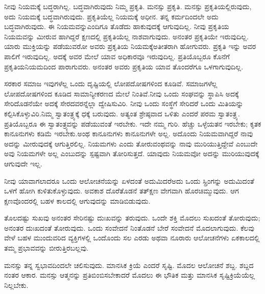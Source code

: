 ನೀವು ನಿಯಮಕ್ಕೆ ಬದ್ಧರಾಗಿಲ್ಲ. ಬದ್ಧವಾಗಿರುವುದು ನಿಮ್ಮ ಪ್ರಕೃತಿ. ಮನಸ್ಸು ಪ್ರಕೃತಿ. ಮನಸ್ಸು ಪ್ರಕೃತಿಯಲ್ಲಿರುವುದು, ಅದು ನಿಯಮಕ್ಕೆ ಬದ್ಧವಾಗಿರುವುದು. ಪ್ರಕೃತಿಯೆಲ್ಲ ನಿಯಮಕ್ಕೆ ಅಧೀನ. ತನ್ನ ಕರ್ಮದಿಂದಲೇ ಅದು ಬದ್ಧವಾಗಿರುವುದು. ಈ ನಿಯಮವನ್ನು\break ಎಂದಿಗೂ ತೊಡೆದು ಹಾಕುವುದಕ್ಕೆ ಆಗುವುದಿಲ್ಲ. ನೀವು ಪ್ರಕೃತಿಯ ನಿಯಮವನ್ನು ಮೀರುವ ಹಾಗಿದ್ದರೆ ಕ್ಷಣದಲ್ಲಿ ಪ್ರಕೃತಿಯೆಲ್ಲ ನಾಶವಾಗುವುದು. ಅನಂತರ ಪ್ರಕೃತಿಯೇ ಇರುವುದಿಲ್ಲ. ಯಾರು ಮುಕ್ತಿಯನ್ನು ಪಡೆಯುವರೋ ಅವರು ಪ್ರಕೃತಿಯ ನಿಯಮಕ್ಕೆ\break ಅತೀತರಾಗಿ ಹೋಗುವರು. ಪ್ರಕೃತಿ ಇನ್ನು ಅವರ ಪಾಲಿಗೆ ಇರುವುದಿಲ್ಲ. ಅದಕ್ಕೆ ಅವರ ಮೇಲೆ ಯಾವ ಅಧಿಕಾರವೂ ಇರುವುದಿಲ್ಲ. ಪ್ರತಿಯೊಬ್ಬರೂ ಕೊನೆಗೆ ಪ್ರಕೃತಿಯ\break ನಿಯಮದಿಂದ ಪಾರಾಗುವರು. ಅನಂತರ ಅವರು ಪ್ರಕೃತಿಯ ಯಾವ ತೊಂದರೆಗೂ ಒಳಗಾಗುವುದಿಲ್ಲ.

ಸರಕಾರ ಸಮಾಜ ಇವುಗಳೆಲ್ಲ ಒಂದು ದೃಷ್ಟಿಯಲ್ಲಿ ಲೋಪದೋಷಗಳಿಂದ ಕೂಡಿವೆ. ಸಮಾಜಗಳೆಲ್ಲ ಲೋಪದೋಷಗಳಿಂದ ಕೂಡಿದ ಸಾಮಾನ್ಯೀಕರಣದ ಮೇಲೆ ನಿಂತಿವೆ.\break ನೀವು ಒಂದು ಸಂಘವನ್ನು ಸ್ಥಾಪಿಸಿ ಅದಕ್ಕೆ ಸೇರಿದೊಡನೆಯೇ ಅದಕ್ಕೆ ಸೇರದವರನ್ನೆಲ್ಲಾ ದ್ವೇಷಿಸುವಿರಿ. ನೀವು ಒಂದು ಸಂಸ್ಥೆಗೆ ಸೇರಿದರೆ ಒಂದು ಮಿತಿಯನ್ನು ಕಲ್ಪಿಸಿಕೊಳ್ಳುವಿರಿ.\break ನಿಮ್ಮ ಸ್ವಾತಂತ್ರ್ಯಕ್ಕೆ ಧಕ್ಕೆ ಬರುವುದು. ಅತ್ಯಂತ ಶ್ರೇಷ್ಠವಾದ ಒಳಿತು ಎಂದರೆ ಪರಮ ಸ್ವಾತಂತ್ರ್ಯ. ಪ್ರತಿಯೊಬ್ಬರೂ ಈ ಸ್ವಾತಂತ್ರ್ಯವನ್ನು ಪಡೆಯುವಂತೆ ಇರಬೇಕು. ಇದೇ ನಮ್ಮ ಗುರಿ. ಹೆಚ್ಚು ಒಳ್ಳೆಯತನ ಇರಬೇಕು; ಕೃತಕ ಕಾನೂನುಗಳು ಕಡಿಮೆ ಇರಬೇಕು.\break ಅಂಥ ಕಾನೂನುಗಳು ಕಾನೂನುಗಳೇ ಅಲ್ಲ. ಅದೊಂದು ನಿಯಮವಾಗಿದ್ದರೆ ನಾವು ಅದನ್ನು ಮೀರುವುದಕ್ಕೆ ಆಗುತ್ತಿರಲಿಲ್ಲ. ನಿಯಮಗಳು ಎಂದು ತೋರುವಂಥವನ್ನು ನಾವು ಮುರಿಯುತ್ತಿದ್ದೇವೆ ಎಂಬುದೇ ಅವು ನಿಯಮಗಳೇ ಅಲ್ಲ ಎಂಬುದನ್ನು ಸ್ಪಷ್ಟವಾಗಿ ತೋರಿಸುತ್ತದೆ. ಯಾವುದು ನಿಯಮವೋ ಅದನ್ನು ಮುರಿಯುವುದಕ್ಕೆ ಆಗುವುದೇ ಇಲ್ಲ.

\vskip 6pt

ನೀವು ಯಾವಾಗಲಾದರೂ ಒಂದು ಆಲೋಚನೆಯನ್ನು ಏಳದಂತೆ ಅದುಮಿದರೆ\break ಅದು ಒಂದು ಸ್ಪ್ರಿಂಗನ್ನು ಅದುಮಿದಂತೆ ಒಳಗೆ ಹೋಗಿ ಕುಳಿತುಕೊಳ್ಳುವುದು. ಅವಕಾಶ ದೊರೆತೊಡನೆ ತತ್​ಕ್ಷಣ ವೇಗವಾಗಿ ಹೊರಚಿಮ್ಮುವುದು. ಆಗ ಕ್ಷಣವೊಂದರಲ್ಲಿ ಬಹಳ ಕಾಲದಲ್ಲಿ ಆಗುವುದನ್ನು ಮಾಡಿಬಿಡುವುದು.

\vskip 6pt

ತೊಲದಷ್ಟು ಸುಖವು ಅನಂತರ ಸೇರಿನಷ್ಟು ದುಃಖವನ್ನು ತರುವುದು. ಒಂದೇ ಶಕ್ತಿ ಮೊದಲು ಸುಖದಂತೆ ತೋರುವುದು; ಅನಂತರ ದುಃಖದಂತೆ ತೋರುವುದು. ಒಂದು ಸಂವೇದನೆ ನಿಂತೊಡನೆ ಬೇರೆ ಸಂವೇದನೆ ಮೊದಲಾಗುವುದು. ಕೆಲವು ವೇಳೆ ಬಹಳ ಮುಂದುವರಿದ ವ್ಯಕ್ತಿಗಳಲ್ಲಿ ಒಂದೊಂದು ಸಲ ಎರಡು ಅಥವಾ ನೂರಾರು ಆಲೋಚನೆಗಳು ಏಕಕಾಲದಲ್ಲಿ ತಮ್ಮ ಪ್ರಭಾವವನ್ನು ಬೀರುತ್ತಿರಬಲ್ಲವು.

\vskip 6pt

ಮನಸ್ಸು ತನ್ನ ಸ್ವಭಾವದಿಂದಲೇ ಚಲಿಸುವುದು. ಮಾನಸಿಕ ಕ್ರಿಯೆ ಎಂದರೆ ಸೃಷ್ಟಿ. ಮೊದಲ ಆಲೋಚನೆ ಶಬ್ದ. ಶಬ್ದದ ನಂತರ ಆಕಾರ. ಮನಸ್ಸು ಆತ್ಮನನ್ನು ಪ್ರತಿಬಿಂಬಿಸಬೇಕಾದರೆ ಮೊದಲು ಈ ಭೌತಿಕ ಮತ್ತು ಮಾನಸಿಕ ಸೃಷ್ಟಿಕ್ರಿಯೆಯೆಲ್ಲ ನಿಲ್ಲಬೇಕು.

